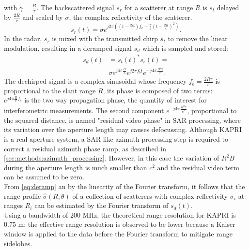 with $\gamma = \frac{B}{\tau}$.
The backscattered signal $s_r$ for a scatterer at range $R$ is $s_t$ delayed by $\frac{2 R}{c}$ and scaled by  $\sigma$, the complex reflectivity of the scatterer.
\begin{equation}
		s_r\left(t\right) = \sigma e^{j 2 \pi \left( \left(t - \frac{2 R}{c}\right) f_{c} +  \frac{\gamma}{2} \left(t - \frac{2 R}{c}\right)^2 \right)}.
\end{equation}
In the radar, $s_r$ is mixed with the transmitted chirp $s_t$  to remove the linear modulation, resulting in a deramped signal $s_d$ which is sampled and stored: 
\begin{equation}\label{eq:deramp}
	\begin{aligned}
	s_{d}\left(t\right) &=s_t\left(t\right)^*s_r\left(t\right) =\\ 
	&\sigma e^{j 4 \pi \frac{ R}{\lambda}}  e^{j 2 \pi f_b t}  e^{-j 4 \pi \frac{R^2 \gamma}{c^2}}.
	\end{aligned}
\end{equation} 
The dechirped signal is a complex sinusoidal whose frequency $f_{b} = \frac{2 R \gamma}{c}$ is proportional to the slant range $R$, its phase is composed of two terms:\\ $ e^{j 4 \pi \frac{R}{c}f_c}$ is the two way propagation phase, the quantity of interest for  interferometric measurements. The second component $e^{-j 4 \pi \frac{R^2 \gamma}{c^2}}$, proportional to the squared distance, is named "residual video phase" in SAR processing, where its variation over the aperture length may causes defocussing. Although KAPRI is a real-aperture system, a SAR-like azimuth processing step is required to correct a residual azimuth phase ramp, as described in \autoref{sec:methods:azimuth_processing}. However, in this case the variation of $R^2B$ during the aperture length is much smaller than $c^2$ and the residual video term can be assumed to be zero.\\
From \eqref{eq:deramp} an by the linearity of the Fourier transform, it follows that the range profile $\hat{\sigma}\left(R, \theta\right)$ of a collection of scatterers with complex reflectivity $\sigma_i$ at ranges $R_{i}$ can be estimated by the Fourier transform of $s_{d}\left(t\right)$.\\
Using a bandwidth of 200 MHz, the theoretical range resolution for KAPRI is 0.75 m\cite{Strozzi2011}; the effective range resolution is observed to be lower because a Kaiser window is applied to the data before the Fourier transform to mitigate range sidelobes.\\
